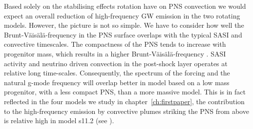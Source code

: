Based solely on the stabilising effects rotation have on PNS convection we would expect an overall 
reduction of high-frequency GW emission in the two rotating models. However, the picture is not
so simple. We have to consider how well the Brunt-V\"{a}is\"{a}l\"{a}-frequency in the PNS surface overlaps with
the typical SASI and convective timescales. The compactness of the PNS tends to increase with
progenitor mass, which results in a higher Brunt-V\"{a}is\"{a}l\"{a}-frequency \citep{mueller_13}.
SASI activity and neutrino driven convection in the post-shock layer operates at relative long time-scales.
Consequently, the spectrum of the forcing and the natural g-mode frequency will overlap better
in model based on a low mass progenitor, with a less compact PNS, than a more massive model. 
This is in fact reflected in the four models we study in chapter~\ref{ch:firstpaper},
the contribution to the high-frequency emission by convective plumes striking the PNS from above
is relative high in model s11.2 (see ).


